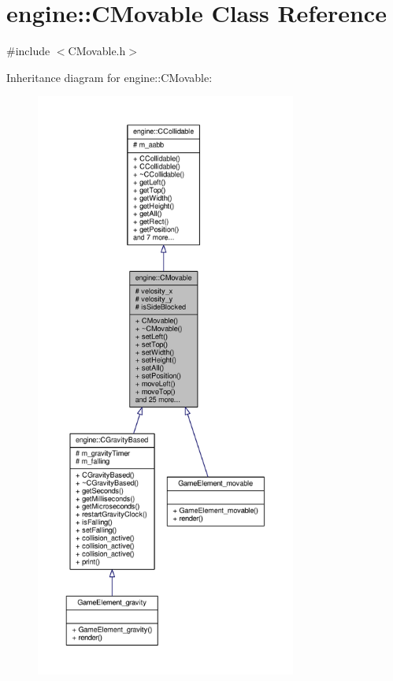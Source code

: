 \hypertarget{classengine_1_1CMovable}{\section{engine\-:\-:C\-Movable Class Reference}
\label{classengine_1_1CMovable}
}


{\ttfamily \#include $<$C\-Movable.\-h$>$}



Inheritance diagram for engine\-:\-:C\-Movable\-:\nopagebreak
\begin{figure}[H]
\begin{center}
\leavevmode
\includegraphics[height=550pt]{classengine_1_1CMovable__inherit__graph}
\end{center}
\end{figure}


